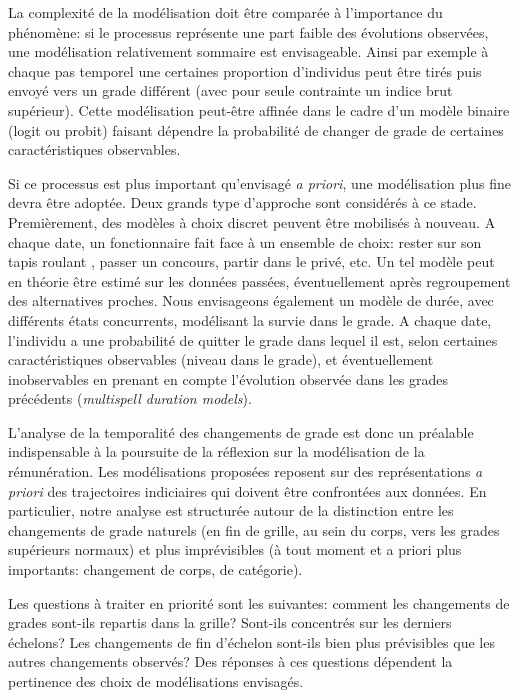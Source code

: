 \documentclass[11pt,a4paper]{article}
\begin{document}
La complexité de la modélisation doit être comparée à l'importance du phénomène: si le processus représente une part faible des évolutions observées, une modélisation relativement sommaire est envisageable. Ainsi par exemple à chaque pas temporel une certaines proportion d'individus peut être tirés puis envoyé vers un grade différent (avec pour seule contrainte un indice brut supérieur). Cette modélisation peut-être affinée dans le cadre d'un modèle binaire (logit ou probit) faisant dépendre la probabilité de changer de grade de certaines caractéristiques observables. 

Si ce processus est plus important qu'envisagé \textit{a priori}, une modélisation plus fine devra être adoptée. Deux grands type d'approche sont considérés à ce stade. Premièrement, des modèles à choix discret peuvent être mobilisés à nouveau. A chaque date, un fonctionnaire fait face à un ensemble de choix: rester sur son \og tapis roulant \fg{}, passer un concours, partir dans le privé, etc. Un tel modèle peut en théorie être estimé sur les données passées, éventuellement après regroupement des alternatives proches. Nous envisageons également un modèle de durée, avec différents états concurrents, modélisant la survie dans le grade. A chaque date, l'individu a une probabilité de quitter le grade dans lequel il est, selon certaines caractéristiques observables (niveau dans le grade), et éventuellement inobservables en prenant en compte l'évolution observée dans les grades précédents (\textit{multispell duration models}). 


\bigskip

L'analyse de la temporalité des changements de grade est donc un préalable indispensable à la poursuite de la réflexion sur la modélisation de la rémunération. Les modélisations proposées reposent sur des représentations \textit{a priori} des trajectoires indiciaires qui doivent être confrontées aux données. En particulier, notre analyse est structurée autour de la distinction entre les changements de grade \og naturels \fg{} (en fin de grille, au sein du corps, vers les grades supérieurs normaux) et plus imprévisibles (à tout moment et a priori plus importants: changement de corps, de catégorie).  

Les questions à traiter en priorité sont les suivantes: comment les changements de grades sont-ils repartis dans la grille? Sont-ils concentrés sur les derniers échelons? Les changements de fin d'échelon sont-ils bien plus prévisibles que les autres changements observés? Des réponses à ces questions dépendent la pertinence des choix de modélisations envisagés. 


\ifx\isEmbedded\undefined
\newpage
 

\end{document}
